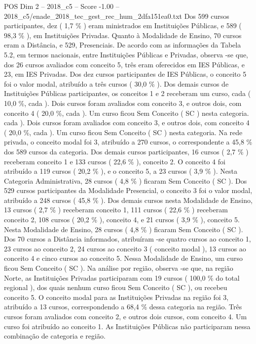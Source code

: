\begin{textsample}{POS Dim 2 – 2018\_c5 – Score -1.00 – 2018\_c5/enade\_2018\_tec\_gest\_rec\_hum\_2dfa151ea0.txt}
Dos 599 cursos participantes, dez ( 1,7 \% ) eram ministrados em Instituições Públicas, e 589 ( 98,3 \% ), em Instituições Privadas.
Quanto à Modalidade de Ensino, 70 cursos eram a Distância, e 529, Presenciais.
De acordo com as informações da Tabela 5.2, em termos nacionais, entre Instituições Públicas e Privadas, observa -se que, dos 26 cursos avaliados com conceito 5, três eram oferecidos em IES Públicas, e 23, em IES Privadas.
Dos dez cursos participantes de IES Públicas, o conceito 5 foi o valor modal, atribuído a três cursos ( 30,0 \% ).
Dos demais cursos de Instituições Públicas participantes, os conceitos 1 e 2 receberam um curso, cada ( 10,0 \%, cada ).
Dois cursos foram avaliados com conceito 3, e outros dois, com conceito 4 ( 20,0 \%, cada ).
Um curso ficou Sem Conceito ( SC ) nesta categoria. cada ).
Dois cursos foram avaliados com conceito 3, e outros dois, com conceito 4 ( 20,0 \%, cada ).
Um curso ficou Sem Conceito ( SC ) nesta categoria.
Na rede privada, o conceito modal foi 3, atribuído a 270 cursos, o correspondente a 45,8 \% dos 589 cursos da categoria.
Dos demais cursos participantes, 16 cursos ( 2,7 \% ) receberam conceito 1 e 133 cursos ( 22,6 \% ), conceito 2.
O conceito 4 foi atribuído a 119 cursos ( 20,2 \% ), e o conceito 5, a 23 cursos ( 3,9 \% ).
Nesta Categoria Administrativa, 28 cursos ( 4,8 \% ) ficaram Sem Conceito ( SC ).
Dos 529 cursos participantes da Modalidade Presencial, o conceito 3 foi o valor modal, atribuído a 248 cursos ( 45,8 \% ).
Dos demais cursos nesta Modalidade de Ensino, 13 cursos ( 2,7 \% ) receberam conceito 1, 111 cursos ( 22,6 \% ) receberam conceito 2, 108 cursos ( 20,2 \% ), conceito 4, e 21 cursos ( 3,9 \% ), conceito 5.
Nesta Modalidade de Ensino, 28 cursos ( 4,8 \% ) ficaram Sem Conceito ( SC ).
Dos 70 cursos a Distância informados, atribuíram -se quatro cursos ao conceito 1, 23 cursos ao conceito 2, 24 cursos ao conceito 3 ( conceito modal ), 13 cursos ao conceito 4 e cinco cursos ao conceito 5.
Nessa Modalidade de Ensino, um curso ficou Sem Conceito ( SC ).
Na análise por região, observa -se que, na região Norte, as Instituições Privadas participaram com 19 cursos ( 100,0 \% do total regional ), dos quais nenhum curso ficou Sem Conceito ( SC ), ou recebeu conceito 5.
O conceito modal para as Instituições Privadas na região foi 3, atribuído a 13 cursos, correspondendo a 68,4 \% dessa categoria na região.
Três cursos foram avaliados com conceito 2, e outros dois cursos, com conceito 4.
Um curso foi atribuído ao conceito 1.
As Instituições Públicas não participaram nessa combinação de categoria e região.

\end{textsample}
